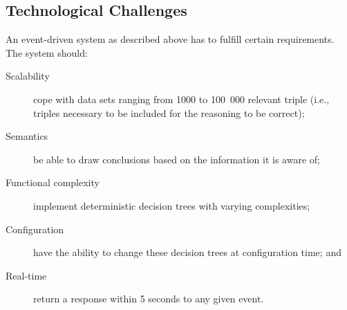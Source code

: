 



\subsection{Technological Challenges}
\label{chal}




An event-driven system as described above has to fulfill certain requirements. The system should:
\begin{description}
\item[Scalability] cope with data sets ranging from 1000 to 100~000 relevant triple (i.e., triples necessary to be included for the reasoning to be correct);
\item[Semantics] be able to draw conclusions based on the information it is aware of;
\item[Functional complexity] implement deterministic decision trees with varying complexities; %
\item[Configuration] have the ability to change these decision trees at configuration time; and
\item[Real-time] return a response within 5 seconds to any given event.
\end{description}

